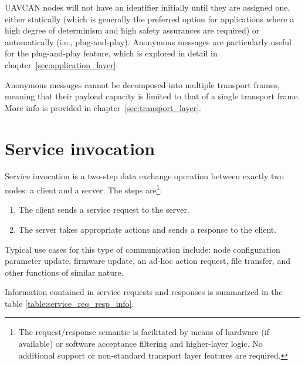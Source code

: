 UAVCAN nodes will not have an identifier initially until they are assigned one,
either statically (which is generally the preferred option for applications where a high degree of
determinism and high safety assurances are required) or automatically (i.e., plug-and-play).
Anonymous messages are particularly useful for the plug-and-play feature,
which is explored in detail in chapter~\ref{sec:application_layer}.

Anonymous messages cannot be decomposed into multiple transport frames,
meaning that their payload capacity is limited to that of a single transport frame.
More info is provided in chapter~\ref{sec:transport_layer}.

\section{Service invocation}

Service invocation is a two-step data exchange operation between exactly two nodes: a client and a server.
The steps are\footnote{The request/response semantic is facilitated by means of hardware (if available)
or software acceptance filtering and higher-layer logic.
No additional support or non-standard transport layer features are required.}:

\begin{enumerate}
    \item The client sends a service request to the server.
    \item The server takes appropriate actions and sends a response to the client.
\end{enumerate}

Typical use cases for this type of communication include:
node configuration parameter update, firmware update, an ad-hoc action request, file transfer,
and other functions of similar nature.

Information contained in service requests and responses is summarized in the
table \ref{table:service_req_resp_info}.

